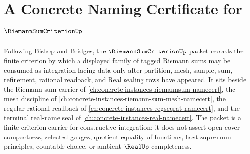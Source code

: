 \chapter{A Concrete Naming Certificate for $\RiemannSumCriterionUp$}
\label{ch:concrete-instances-riemann-sum-criterion-namecert}

Following Bishop and Bridges, the $\RiemannSumCriterionUp$ packet records the finite criterion by which a displayed family of tagged Riemann sums may be consumed as integration-facing data only after partition, mesh, sample, sum, refinement, rational readback, and Real sealing rows have appeared. It sits beside the Riemann-sum carrier of \autoref{ch:concrete-instances-riemannsum-namecert}, the mesh discipline of \autoref{ch:concrete-instances-riemann-sum-mesh-namecert}, the regular rational readback of \autoref{ch:concrete-instances-regseqrat-namecert}, and the terminal real-name seal of \autoref{ch:concrete-instances-real-namecert}. The packet is a finite criterion carrier for constructive integration; it does not assert open-cover compactness, selected gauges, quotient equality of functions, host supremum principles, countable choice, or ambient $\RealUp$ completeness.

